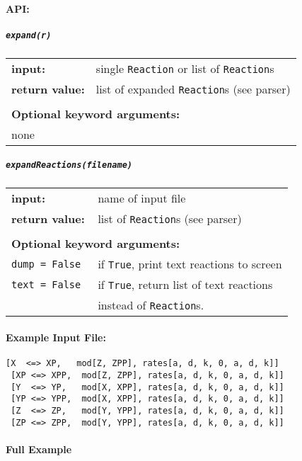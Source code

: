 \paragraph{API:}

\subparagraph{\tt expand(r)\\}

\begin{tabular}{ll}
\textbf{input:} & single {\tt Reaction} or list of {\tt Reaction}s \\
\textbf{return value:}& list of expanded {\tt Reaction}s (see parser) \\  \\
\multicolumn{2}{l}{\textbf{Optional keyword arguments:}} \\
none
\end{tabular}


\subparagraph{\tt expandReactions(filename)\\}

\begin{tabular}{ll}
\textbf{input:} & name of input file \\
\textbf{return value:}& list of {\tt Reaction}s (see parser) \\  \\
\multicolumn{2}{l}{\textbf{Optional keyword arguments:}}\\
\tt{dump = False} & if {\tt True}, print text reactions to screen \\
\tt{text = False} & if {\tt True}, return list of text reactions\\
& instead of {\tt Reaction}s.
\end{tabular}

\paragraph{Example Input File:}
\begin{Verbatim}[frame=single]
 [X  <=> XP,   mod[Z, ZPP], rates[a, d, k, 0, a, d, k]]
 [XP <=> XPP,  mod[Z, ZPP], rates[a, d, k, 0, a, d, k]]
 [Y  <=> YP,   mod[X, XPP], rates[a, d, k, 0, a, d, k]] 
 [YP <=> YPP,  mod[X, XPP], rates[a, d, k, 0, a, d, k]] 
 [Z  <=> ZP,   mod[Y, YPP], rates[a, d, k, 0, a, d, k]]
 [ZP <=> ZPP,  mod[Y, YPP], rates[a, d, k, 0, a, d, k]]
\end{Verbatim}

\paragraph{Full Example}

